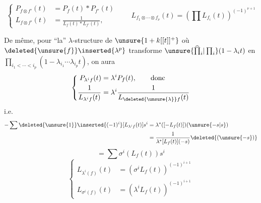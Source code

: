 
\[
\left\{\begin{aligned}
P_{f\otimes f'}(t)&=P_f(t)*P_{f'}(t)\\
L_{f\otimes f'}(t)&=\frac{1}{L_f(t)*L_{f'}(t)},
\end{aligned}\right.
\qquad L_{f_1\otimes\cdots\otimes f_{\nu}}(t)=\left(\prod L_{f_i}(t)\right)^{(-1)^{\nu+1}}
\]

De même, pour ``la'' $\lambda$-structure de $\unsure{1+k[[t]]^{+}}$ où $\deleted{\unsure{f}}\inserted{\lambda^p}$ transforme $\unsure{\widehat{\prod}_i|\prod_i}(1-\lambda_i t)$ en $\prod_{i_1<\cdots<i_p}(1-\lambda_{i_1}\cdots\lambda_{i_p}t)$, on aura
\[
\left\{\begin{aligned}
P_{\lambda^i f}(t)&=\lambda^iP_f(t),\qquad\text{donc}\\
\frac{1}{L_{\lambda^i f}(t)}&=\lambda^i\frac{1}{L_{\deleted{\unsure{\lambda}}f}(t)}
\end{aligned}\right.
\]
i.e.
\[
\begin{aligned}
-\sum\deleted{\unsure{1}}\inserted{(-1)^i}[L_{\lambda^i f}(t)]s^i
&=\lambda^*([-L_f(t)])(\unsure{-s|s})\\
&=\frac{1}{\lambda^*[L_f(t)](-s)}\deleted{(\unsure{-s})}
\end{aligned}
\]
\deleted{
\[
\left(\sum[\lambda^i(L_f(t))]s^i\right)\left(\sum[L_{\lambda^i f}(t)]s^i\right)=-1=\left[\frac{1}{1-t}\right]
\]
}
\[
=\sum\sigma^i(L_f(t))s^i
\]
\[
\left\{\begin{aligned}
L_{\lambda^i(f)}(t)&=\left(\sigma^i L_f(t)\right)^{(-1)^{i+1}}\\
L_{\sigma^i(f)}(t)&=\left(\lambda^i L_f(t)\right)^{(-1)^{i+1}}
\end{aligned}\right.
\]

